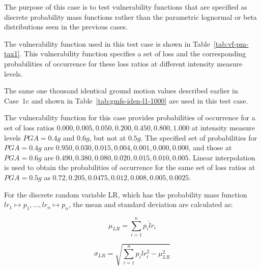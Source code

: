 The purpose of this case is to test vulnerability functions that are specified as discrete probability mass functions rather than the parametric lognormal or beta distributions seen in the previous cases.



The vulnerability function used in this test case is shown in Table~\ref{tab:vf-pm-tax1}. This vulnerability function specifies a set of loss and the corresponding probabilities of occurrence for these loss ratios at different intensity measure levels.

The same one thousand identical ground motion values described earlier in Case~1c and shown in Table~\ref{tab:gmfs-iden-l1-1000} are used in this test case.

The vulnerability function for this case provides probabilities of occurrence for a set of loss ratios ${0.000, 0.005, 0.050, 0.200, 0.450, 0.800, 1.000}$ at intensity measure levels $PGA = 0.4 g$ and $0.6 g$, but not at $0.5 g$. The specified set of probabilities for $PGA = 0.4 g$ are ${0.950, 0.030, 0.015, 0.004, 0.001, 0.000, 0.000}$, and those at $PGA = 0.6 g$ are ${0.490, 0.380, 0.080, 0.020, 0.015, 0.010, 0.005}$. Linear interpolation is used to obtain the probabilities of occurrence for the same set of loss ratios at $PGA = 0.5 g$ as ${0.72, 0.205, 0.0475, 0.012, 0.008, 0.005, 0.0025}$.

For the discrete random variable LR, which has the probability mass function $lr_1 \mapsto p_1, \dotsc, lr_n \mapsto p_n$, the mean and standard deviation are calculated as:

\begin{equation}
\mu_{LR} = \sum_{i=1}^{n} p_i \dot lr_i
\end{equation}

\begin{equation}
\sigma_{LR} = \sqrt{\sum_{i=1}^{n} p_i \dot lr_i^2 - \mu_{LR}^2}
\end{equation}

